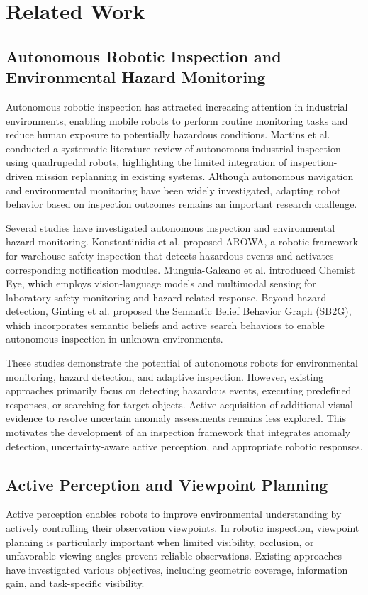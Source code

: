 
\chapter{Related Work}\label{chap:template}

\section{Autonomous Robotic Inspection and Environmental Hazard Monitoring}
Autonomous robotic inspection has attracted increasing attention in industrial environments, enabling mobile robots to perform routine monitoring tasks and reduce human exposure to potentially hazardous conditions.
Martins et al. \cite{martins2026quadruped} conducted a systematic literature review of autonomous industrial inspection using quadrupedal robots, highlighting the limited integration of inspection-driven mission replanning in existing systems.
Although autonomous navigation and environmental monitoring have been widely investigated, adapting robot behavior based on inspection outcomes remains an important research challenge.

Several studies have investigated autonomous inspection and environmental hazard monitoring.
Konstantinidis et al. \cite{konstantinidis2022arowa} proposed AROWA, a robotic framework for warehouse safety inspection that detects hazardous events and activates corresponding notification modules.
Munguia-Galeano et al. \cite{munguia2026chemist} introduced Chemist Eye, which employs vision-language models and multimodal sensing for laboratory safety monitoring and hazard-related response.
Beyond hazard detection, Ginting et al. \cite{ginting2024sb2g} proposed the Semantic Belief Behavior Graph (SB2G), which incorporates semantic beliefs and active search behaviors to enable autonomous inspection in unknown environments.

These studies demonstrate the potential of autonomous robots for environmental monitoring, hazard detection, and adaptive inspection.
However, existing approaches primarily focus on detecting hazardous events, executing predefined responses, or searching for target objects.
Active acquisition of additional visual evidence to resolve uncertain anomaly assessments remains less explored.
This motivates the development of an inspection framework that integrates anomaly detection, uncertainty-aware active perception, and appropriate robotic responses.

\section{Active Perception and Viewpoint Planning}
Active perception enables robots to improve environmental understanding by actively controlling their observation viewpoints.
In robotic inspection, viewpoint planning is particularly important when limited visibility, occlusion, or unfavorable viewing angles prevent reliable observations.
Existing approaches have investigated various objectives, including geometric coverage, information gain, and task-specific visibility.

